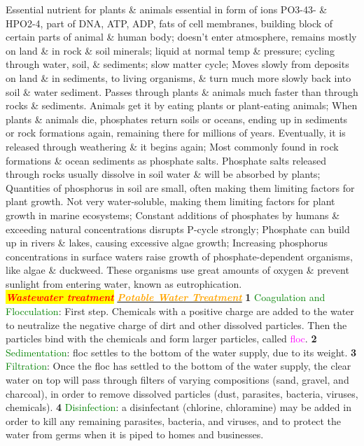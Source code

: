 \documentclass{article}
\newcommand{\red}[1]{\textcolor{red}{#1}}
\newcommand{\green}[1]{\textcolor{green}{#1}}
\newcommand{\pink}[1]{\textcolor{magenta}{#1}}
\newcommand{\orange}[1]{\textcolor{orange}{#1}}
\newcommand{\mysection}[1]{\colorbox{yellow}{\textbf{\textit{\red{#1}}}}}
\newcommand{\mysubsection}[1]{\underline{\textbf{{\textit{\orange{#1}}}}}}
\newcommand{\mysubsub}[1]{{{\green{#1}}}}
\begin{document}
\begin{multicols*}{4}
 			Essential nutrient for plants \& animals essential in form of ions PO3-43- \& HPO2-4, part of DNA, ATP, ADP, fats of cell membranes, building block of certain parts of animal \& human body; doesn’t enter atmosphere, remains mostly on land \& in rock \& soil minerals; liquid at normal temp \& pressure; cycling through water, soil, \& sediments; slow matter cycle; Moves slowly from deposits on land \& in sediments, to living organisms, \& turn much more slowly back into soil \& water sediment. Passes through plants \& animals much faster than through rocks \& sediments. Animals get it by eating plants or plant-eating animals; When plants \& animals die, phosphates return soils or oceans, ending up in sediments or rock formations again, remaining there for millions of years. Eventually, it is released through weathering \& it begins again; Most commonly found in rock formations \& ocean sediments as phosphate salts. Phosphate salts released through rocks usually dissolve in soil water \& will be absorbed by plants; Quantities of phosphorus in soil are small, often making them limiting factors for plant growth. Not very water-soluble, making them limiting factors for plant growth in marine ecosystems; Constant additions of phosphates by humans \& exceeding natural concentrations disrupts P-cycle strongly; Phosphate can build up in rivers \& lakes, causing excessive algae growth; Increasing phosphorus concentrations in surface waters raise growth of phosphate-dependent organisms, like algae \& duckweed. These organisms use great amounts of oxygen \& prevent sunlight from entering water, known as eutrophication.
	\\
   	\mysection{Wastewater treatment}
    	\mysubsection{Potable Water Treatment}
    		\textbf{1} \mysubsub{Coagulation and Flocculation}: First step. Chemicals with a positive charge are added to the water to neutralize the negative charge of dirt and other dissolved particles. Then the particles bind with the chemicals and form larger particles, called \pink{floc}.
    		\textbf{2} \mysubsub{Sedimentation}: floc settles to the bottom of the water supply, due to its weight.
    		\textbf{3} \mysubsub{Filtration}: Once the floc has settled to the bottom of the water supply, the clear water on top will pass through filters of varying compositions (sand, gravel, and charcoal), in order to remove dissolved particles (dust, parasites, bacteria, viruses, chemicals).
    		\textbf{4} \mysubsub{Disinfection}: a disinfectant (chlorine, chloramine) may be added in order to kill any remaining parasites, bacteria, and viruses, and to protect the water from germs when it is piped to homes and businesses.

\end{multicols*}
\end{document}
